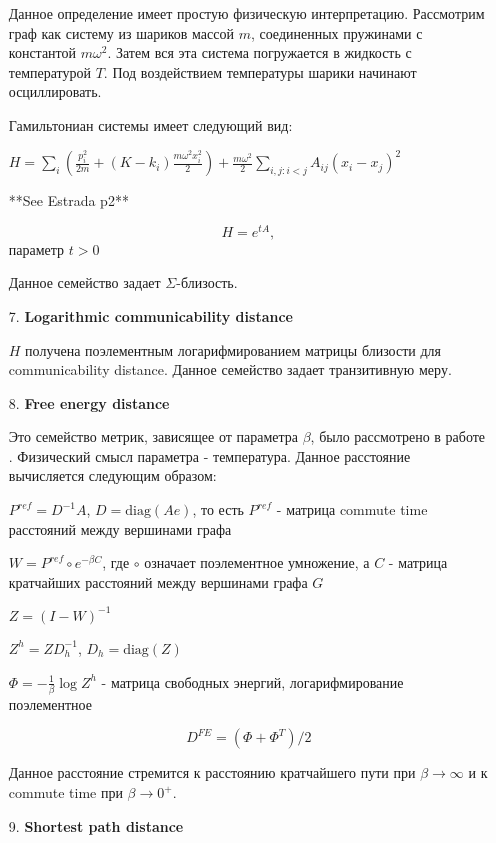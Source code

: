 \begin{itemize}
Данное определение имеет простую физическую интерпретацию. Рассмотрим граф как систему из шариков массой $m$, соединенных пружинами с константой $m \omega ^2$. Затем вся эта система погружается в жидкость с температурой $T$. Под воздействием температуры шарики начинают осциллировать.

Гамильтониан системы имеет следующий вид:

$H = \sum\limits_{i} \left(\frac{p_i^2}{2m} + (K-k_i)\frac{m\omega ^2 x_i^2}{2}\right) + \frac{m \omega ^2}{2} \sum\limits_{i,j : i<j} A_{ij} (x_i-x_j)^2 $

**See Estrada p2**

\begin{equation}
H = e^{tA},
\end{equation}
 параметр $t > 0$
 
Данное семейство задает $\Sigma$-близость.

\item[7.] \textbf{Logarithmic communicability distance}

$H$ получена поэлементным логарифмированием матрицы близости для communicability distance. Данное семейство задает транзитивную меру.

\item[8.] \textbf{Free energy distance}

Это семейство метрик, зависящее от параметра $\beta$, было рассмотрено в работе \cite{kivimaki2014developments}. Физический смысл параметра - температура. Данное расстояние вычисляется следующим образом:

$P^{ref} = D^{-1}A$, $D = \text{diag}(Ae)$, то есть $P^{ref}$ - матрица commute time расстояний между вершинами графа

$W = P^{ref} \circ e^{-\beta C}$, где $\circ$ означает поэлементное умножение, а $C$ - матрица кратчайших расстояний между вершинами графа $G$

$Z = (I-W)^{-1}$

$Z^h = ZD_h^{-1}$, $D_h = \text{diag}(Z)$

$\Phi = -\frac{1}{\beta} \log Z^h$ - матрица свободных энергий, логарифмирование поэлементное

\begin{equation}
D^{FE} = (\Phi + \Phi ^T)/ 2
\end{equation}

Данное расстояние стремится к расстоянию кратчайшего пути при $\beta \rightarrow \infty$ и к commute time при $\beta \rightarrow 0^+$.

\item[9.] \textbf{Shortest path distance}


\end{itemize}
